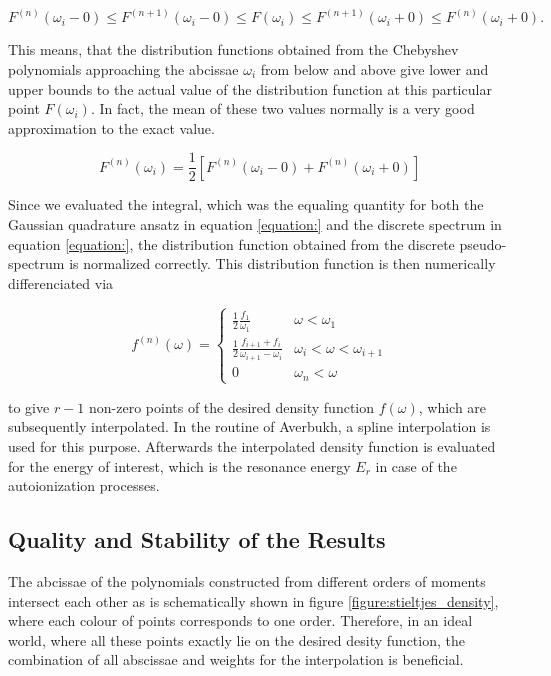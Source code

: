 \begin{equation} \label{equation:Chebyshev_inequalities}
  F^{(n)}(\omega_i - 0) \le F^{(n+1)}(\omega_i - 0) \le F(\omega_i)
  \le F^{(n+1)}(\omega_i + 0) \le F^{(n)}(\omega_i + 0).
\end{equation}

This means, that the distribution functions obtained from the Chebyshev
polynomials approaching the abcissae $\omega_i$ from below and above
give lower and upper bounds to the actual value of the distribution
function at this particular point $F(\omega_i)$. In fact, the mean of these
two values normally is a very good approximation to the exact value.

\begin{equation}
  F^{(n)} (\omega_i) = \frac 12 \left[ F^{(n)} (\omega_i - 0)
                       + F^{(n)} (\omega_i+0) \right]
\end{equation}

Since we evaluated the integral,
which was the equaling quantity for both the Gaussian quadrature ansatz
in equation \ref{equation:} and the discrete spectrum in equation
\ref{equation:}, the distribution function obtained from the
discrete pseudo-spectrum is normalized correctly.
This distribution function is then numerically differenciated via

\begin{equation}
  f^{(n)} (\omega) =
  \begin{cases}
    \frac 12 \frac{f_1}{\omega_1}    & \omega < \omega_1\\
    \frac 12 \frac{f_{i+1} + f_i}{\omega_{i+1} - \omega_i}
                                     & \omega_i < \omega < \omega_{i+1}\\
    0                                & \omega_n < \omega
  \end{cases}
\end{equation}

to give  $r-1$ non-zero points of the desired
density function $f(\omega)$, which are
subsequently interpolated. In the routine of Averbukh, a spline interpolation
is used for this purpose. Afterwards the interpolated density function is evaluated
for the energy of interest, which is the resonance energy $E_r$ in case of the
autoionization processes.

\subsection{Quality and Stability of the Results}
The abcissae of the polynomials constructed from different orders
of moments intersect each other as is schematically shown in
figure \ref{figure:stieltjes_density}, where each colour of points corresponds
to one order. Therefore, in an ideal world, where all these points exactly lie
on the desired desity function, the combination of all abscissae
and weights for the interpolation is beneficial.


